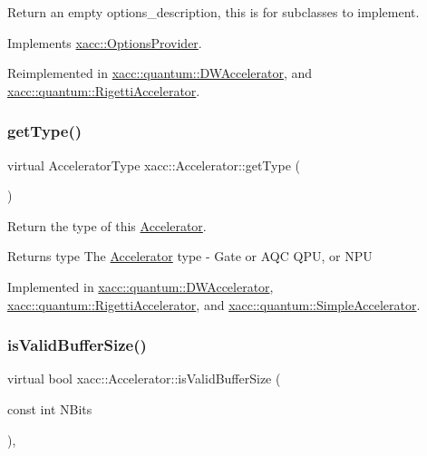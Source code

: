 Return an empty options\+\_\+description, this is for subclasses to implement. 

Implements \hyperlink{a01721_a6d150954f852109bfe2c1ae90222926f}{xacc\+::\+Options\+Provider}.



Reimplemented in \hyperlink{a01133_a09926db9f99706307ae6ce5b56845bca}{xacc\+::quantum\+::\+D\+W\+Accelerator}, and \hyperlink{a01165_a9ee9e62aecbccf193894ca3388676f9f}{xacc\+::quantum\+::\+Rigetti\+Accelerator}.

\mbox{\label{a01613_aaffc3e4bb9880eb5041b1b58ee4c2665}} 
\subsubsection{\texorpdfstring{get\+Type()}{getType()}}
{\footnotesize\ttfamily virtual Accelerator\+Type xacc\+::\+Accelerator\+::get\+Type (\begin{DoxyParamCaption}{ }\end{DoxyParamCaption})\hspace{0.3cm}{\ttfamily [pure virtual]}}

Return the type of this \hyperlink{a01613}{Accelerator}.

\begin{DoxyReturn}{Returns}
type The \hyperlink{a01613}{Accelerator} type -\/ Gate or A\+QC Q\+PU, or N\+PU 
\end{DoxyReturn}


Implemented in \hyperlink{a01133_abe50e427b4bec0460cc238405cb569f9}{xacc\+::quantum\+::\+D\+W\+Accelerator}, \hyperlink{a01165_aab0d4674da5273d55407b9ab77cde890}{xacc\+::quantum\+::\+Rigetti\+Accelerator}, and \hyperlink{a01185_ad76eeb0bbd7de21aad5bd20d20970a98}{xacc\+::quantum\+::\+Simple\+Accelerator}.

\mbox{\label{a01613_ae51584850faeec77299058383977ddeb}} 
\subsubsection{\texorpdfstring{is\+Valid\+Buffer\+Size()}{isValidBufferSize()}}
{\footnotesize\ttfamily virtual bool xacc\+::\+Accelerator\+::is\+Valid\+Buffer\+Size (\begin{DoxyParamCaption}\item[{const int}]{N\+Bits }\end{DoxyParamCaption})\hspace{0.3cm}{\ttfamily [protected]}, {}}

